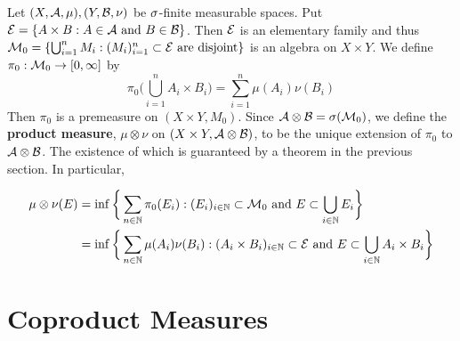 \documentclass{book}
\begin{document}
	\begin{defn}  
		Let $(X,\mathcal{A}, \mu), (Y,\mathcal{B}, \nu)$ be $\sigma$-finite measurable spaces. Put $\mathcal{E} = \{A \times B: A \in \mathcal{A} \text{ and } B \in \mathcal{B}\}$. Then $\mathcal{E}$ is an elementary family and thus $\mathcal{M}_0 = \{\bigcup_{i =1}^n M_i: (M_i)_{i=1 }^n \subset \mathcal{E} \text{ are disjoint}\}$ is an algebra on $X \times Y$. We define $\pi_0: \mathcal{M}_0 \rightarrow [0,\infty]$ by $$\pi_0\bigg(\bigcup_{i=1}^n A_i \times B_i \bigg) = \sum_{i=1}^n\mu(A_i)\nu(B_i)$$ Then $\pi_0$ is a premeasure on $(X \times Y, M_0)$. Since $\mathcal{A} \otimes \mathcal{B} = \sigma(\mathcal{M}_0)$, we define the \textbf{product measure}, $\mu \otimes \nu$ on $(X \times Y, \mathcal{A} \otimes \mathcal{B})$, to be the unique extension of $\pi_0$ to $\mathcal{A} \otimes \mathcal{B}$. The existence of which is guaranteed by a theorem in the previous section. In particular,
		
		\begin{align*}
			\mu \otimes \nu(E) 
			&= \inf \bigg\{\sum_{n \in \mathbb{N}}\pi_0(E_i): (E_i)_{i \in \mathbb{N}} \subset \mathcal{M}_0 \text{ and } E \subset \bigcup_{i \in \mathbb{N}} E_i \bigg\}\\
			&= \inf \bigg\{\sum_{n \in \mathbb{N}}\mu(A_i)\nu(B_i): (A_i \times B_i)_{i \in \mathbb{N}} \subset \mathcal{E} \text{ and } E \subset \bigcup_{i \in \mathbb{N}} A_i \times B_i \bigg \}
		\end{align*}
	\end{defn}











































\newpage
\section{Coproduct Measures}
\end{document}
